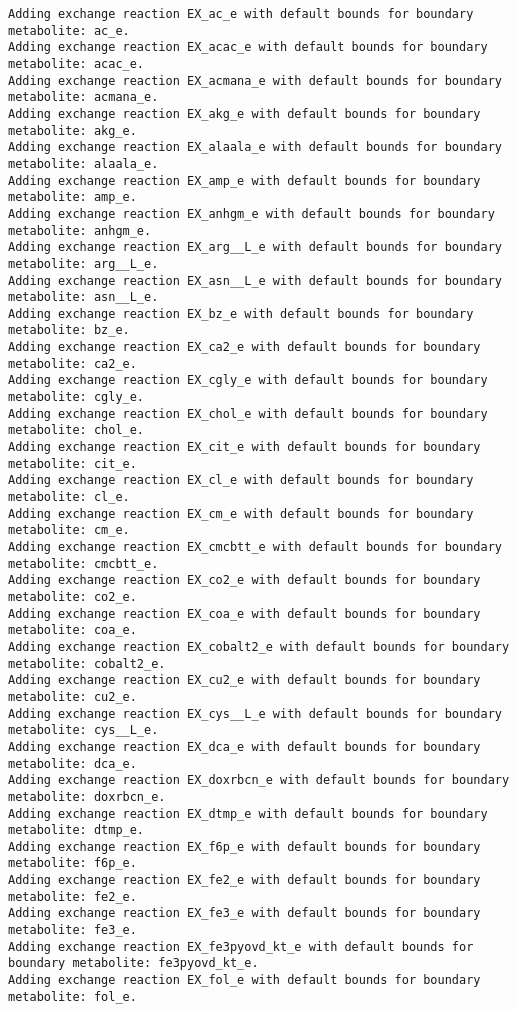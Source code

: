 \documentclass[
  letterpaper,
  DIV=11,
  numbers=noendperiod]{scrartcl}
\begin{document}
\begin{verbatim}
Adding exchange reaction EX_ac_e with default bounds for boundary metabolite: ac_e.
Adding exchange reaction EX_acac_e with default bounds for boundary metabolite: acac_e.
Adding exchange reaction EX_acmana_e with default bounds for boundary metabolite: acmana_e.
Adding exchange reaction EX_akg_e with default bounds for boundary metabolite: akg_e.
Adding exchange reaction EX_alaala_e with default bounds for boundary metabolite: alaala_e.
Adding exchange reaction EX_amp_e with default bounds for boundary metabolite: amp_e.
Adding exchange reaction EX_anhgm_e with default bounds for boundary metabolite: anhgm_e.
Adding exchange reaction EX_arg__L_e with default bounds for boundary metabolite: arg__L_e.
Adding exchange reaction EX_asn__L_e with default bounds for boundary metabolite: asn__L_e.
Adding exchange reaction EX_bz_e with default bounds for boundary metabolite: bz_e.
Adding exchange reaction EX_ca2_e with default bounds for boundary metabolite: ca2_e.
Adding exchange reaction EX_cgly_e with default bounds for boundary metabolite: cgly_e.
Adding exchange reaction EX_chol_e with default bounds for boundary metabolite: chol_e.
Adding exchange reaction EX_cit_e with default bounds for boundary metabolite: cit_e.
Adding exchange reaction EX_cl_e with default bounds for boundary metabolite: cl_e.
Adding exchange reaction EX_cm_e with default bounds for boundary metabolite: cm_e.
Adding exchange reaction EX_cmcbtt_e with default bounds for boundary metabolite: cmcbtt_e.
Adding exchange reaction EX_co2_e with default bounds for boundary metabolite: co2_e.
Adding exchange reaction EX_coa_e with default bounds for boundary metabolite: coa_e.
Adding exchange reaction EX_cobalt2_e with default bounds for boundary metabolite: cobalt2_e.
Adding exchange reaction EX_cu2_e with default bounds for boundary metabolite: cu2_e.
Adding exchange reaction EX_cys__L_e with default bounds for boundary metabolite: cys__L_e.
Adding exchange reaction EX_dca_e with default bounds for boundary metabolite: dca_e.
Adding exchange reaction EX_doxrbcn_e with default bounds for boundary metabolite: doxrbcn_e.
Adding exchange reaction EX_dtmp_e with default bounds for boundary metabolite: dtmp_e.
Adding exchange reaction EX_f6p_e with default bounds for boundary metabolite: f6p_e.
Adding exchange reaction EX_fe2_e with default bounds for boundary metabolite: fe2_e.
Adding exchange reaction EX_fe3_e with default bounds for boundary metabolite: fe3_e.
Adding exchange reaction EX_fe3pyovd_kt_e with default bounds for boundary metabolite: fe3pyovd_kt_e.
Adding exchange reaction EX_fol_e with default bounds for boundary metabolite: fol_e.

\end{verbatim}
\end{document}
